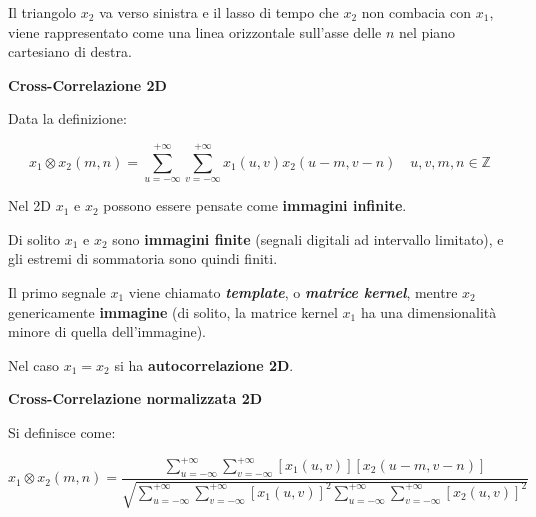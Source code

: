 \documentclass[a4paper]{article}
\begin{document}
	\noindent
	Il triangolo $x_{2}$ va verso sinistra e il lasso di tempo che $x_{2}$ non combacia con $x_{1}$, viene rappresentato come una linea orizzontale sull'asse delle $n$ nel piano cartesiano di destra.
	
	\newpage
	
	\noindent
	\textcolor{Green4}{\textbf{Cross-Correlazione 2D}}\newline
	
	\noindent
	Data la definizione:
	
	\begin{equation*}
		x_{1} \otimes x_{2}\left(m, n\right) = \sum_{u = -\infty}^{+\infty} \sum_{v = -\infty}^{+\infty} x_{1}\left(u, v\right) x_{2}\left(u - m, v - n\right) \hspace{1em} u,v,m,n \in \mathbb{Z}
	\end{equation*}
	
	\noindent
	Nel 2D $x_{1}$ e $x_{2}$ possono essere pensate come \textbf{immagini infinite}.\newline
	
	\noindent
	Di solito $x_{1}$ e $x_{2}$ sono \textbf{immagini finite} (segnali digitali ad intervallo limitato), e gli estremi di sommatoria sono quindi finiti.\newline
	
	\noindent
	Il primo segnale $x_{1}$ viene chiamato \textbf{\emph{template}}, o \textbf{\emph{matrice kernel}}, mentre $x_{2}$ genericamente \textbf{immagine} (di solito, la matrice kernel $x_{1}$ ha una dimensionalità minore di quella dell'immagine).\newline
	
	\noindent
	Nel caso $x_{1} = x_{2}$ si ha \textbf{autocorrelazione 2D}.\newline
	
	\noindent
	\textcolor{Green4}{\textbf{Cross-Correlazione normalizzata 2D}}\newline
	
	\noindent
	Si definisce come:
	
	\begin{equation*}
		x_{1} \otimes x_{2}\left(m,n\right) = \dfrac
		{\sum_{u = -\infty}^{+\infty} \sum_{v = -\infty}^{+\infty} \left[x_{1}\left(u, v\right)\right]\left[x_{2}\left(u-m, v-n\right)\right]}
		{\sqrt{\sum_{u = -\infty}^{+\infty} \sum_{v = -\infty}^{+\infty} \left[x_{1}\left(u,v\right)\right]^{2} {\sum_{u = -\infty}^{+\infty} \sum_{v = -\infty}^{+\infty} \left[x_{2}\left(u,v\right)\right]^{2}}}}
	\end{equation*}
\end{document}
